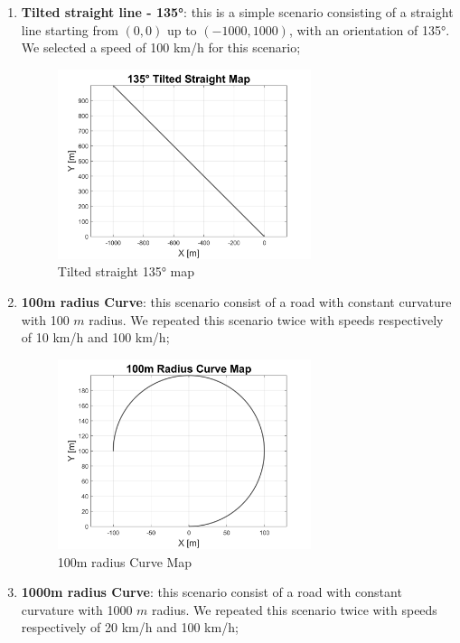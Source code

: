 \begin{enumerate}
\pagebreak
    \item \textbf{Tilted straight line - 135°}: this is a simple scenario consisting of a straight line starting from $(0,0)$ up to $(-1000,1000)$, with an orientation of 135°. We selected a speed of 100 km/h for this scenario;
     \begin{figure}[H]
    \centering
    \includegraphics[width=0.7\textwidth]{Figures/Tilted135Map.png}
    \caption{Tilted straight 135° map}
      \label{fig:Tilted135Map}
\end{figure}
\vspace{1cm}
    \item \textbf{100m radius Curve}: this scenario consist of a road with constant curvature with 100 $m$ radius. We repeated this scenario twice with speeds respectively of 10 km/h and 100 km/h;
     \begin{figure}[H]
    \centering
    \includegraphics[width=0.7\textwidth]{Figures/ShortCurveMap.png}
    \caption{100m radius Curve Map}
      \label{fig:100mCurveMap}
\end{figure}
\pagebreak
    \item \textbf{1000m radius Curve}: this scenario consist of a road with constant curvature with 1000 $m$ radius. We repeated this scenario twice with speeds respectively of 20 km/h and 100 km/h;

\end{enumerate}
